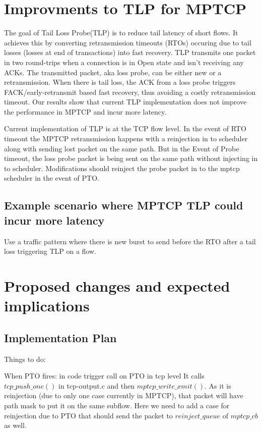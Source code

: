 \documentclass[10pt,draftcls,twocolumn]{IEEEconf}
\begin{document}
\section{Improvments to TLP for MPTCP}
The goal of Tail Loss Probe(TLP) is to reduce tail latency of short flows. It achieves this by converting retransmission timeouts (RTOs) occuring due to tail losses (losses at end of transactions) into fast recovery. TLP transmits one packet in two round-trips when a connection is in Open state and isn't receiving any ACKs. The transmitted packet, aka loss probe, can be either new or a retransmission. When there is tail loss, the ACK from a loss probe triggers FACK/early-retransmit based fast recovery, thus avoiding a costly retransmission timeout. Our results show that current TLP implementation does not improve the performance in MPTCP and incur more latency.

Current implementation of TLP is at the TCP flow level. In the event of RTO timeout the MPTCP retransmission happens with a reinjection in to scheduler along with sending lost packet on the same path. But in the Event of Probe timeout, the loss probe packet is being sent on the same path without injecting in to scheduler.  Modifications should reinject the probe packet in to the mptcp scheduler in the event of PTO.

\subsection{Example scenario where MPTCP TLP could incur more latency}

Use a traffic pattern where there is new burst to send before the RTO after a tail loss triggering TLP on a flow.


\section{Proposed changes and expected implications}


\subsection{Implementation Plan}

Things to do:



When PTO fires: in code trigger call on PTO in tcp level
It calls ${tcp\_push\_one()}$ in tcp-output.c and then ${mptcp\_write\_xmit()}$.
As it is reinjection (due to only one case currently in MPTCP), that packet will have path mask
to put it on the same subflow. Here we need to add a case for reinjection due to PTO that should
send the packet to $reinject\_queue$ of ${mptcp\_cb}$ as well.
\end{document}
